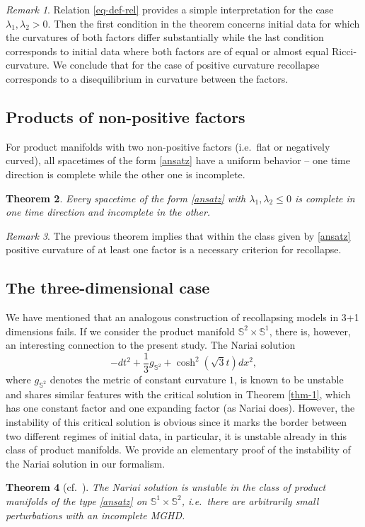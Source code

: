 \documentclass[a4paper,10pt]{article}
\theoremstyle{plain}
\newtheorem{thm}{Theorem}[section]
\theoremstyle{definition}
\theoremstyle{remark}
\newtheorem{rem}[thm]{Remark}
\theoremstyle{plain}
\newcommand{\eq}[1]{\begin{equation}#1\end{equation}}
\newcommand{\la}{\lambda}
\numberwithin{equation}{section}
\begin{document}
%
\begin{rem}
Relation \eqref{eq-def-rel} provides a simple interpretation for the case $\la_1,\la_2>0$. Then the first condition in the theorem concerns initial data for which the curvatures of both factors differ substantially while the last condition corresponds to initial data where both factors are of equal or almost equal Ricci-curvature. We conclude that for the case of positive curvature recollapse corresponds to a disequilibrium in curvature between the factors.
\end{rem}

\subsection{Products of non-positive factors}
For product manifolds with two non-positive factors (i.e.~flat or negatively curved), all spacetimes of the form \eqref{ansatz} have a uniform behavior -- one time direction is complete while the other one is incomplete.
\begin{thm}\label{thm-2}
Every spacetime of the form \eqref{ansatz} with $\la_1,\la_2\leq 0$ is complete in one time direction and incomplete in the other. 
\end{thm}

\begin{rem}
The previous theorem implies that within the class given by \eqref{ansatz} positive curvature of at least one factor is a necessary criterion for recollapse.

\end{rem}
\subsection{The three-dimensional case}
We have mentioned that an analogous construction of recollapsing models in 3+1 dimensions fails. If we consider the product manifold $\mathbb S^2\times \mathbb S^1$, there is, however, an interesting connection to the present study. The Nariai solution
\eq{
-dt^2+\frac{1}{3}g_{\mathbb S^2}+\cosh^2(\sqrt{3}t)dx^2,
}
where $g_{\mathbb S^2}$ denotes the metric of constant curvature $1$, is known to be unstable \cite{Be09-1,Be09-2} and shares similar features with the critical solution in Theorem \ref{thm-1}, which has one constant factor and one expanding factor (as Nariai does). However, the instability of this critical solution is obvious since it marks the border between two different regimes of initial data, in particular, it is unstable already in this class of product manifolds. We provide an elementary proof of the instability of the Nariai solution in our formalism.
\begin{thm}[cf.~\cite{Be09-1,Be09-2}]\label{thm-3}
The Nariai solution is unstable in the class of product manifolds of the type \eqref{ansatz} on $\mathbb S^1\times \mathbb S^2$, i.e.~there are arbitrarily small perturbations with an incomplete MGHD.
\end{thm}
\end{document}
